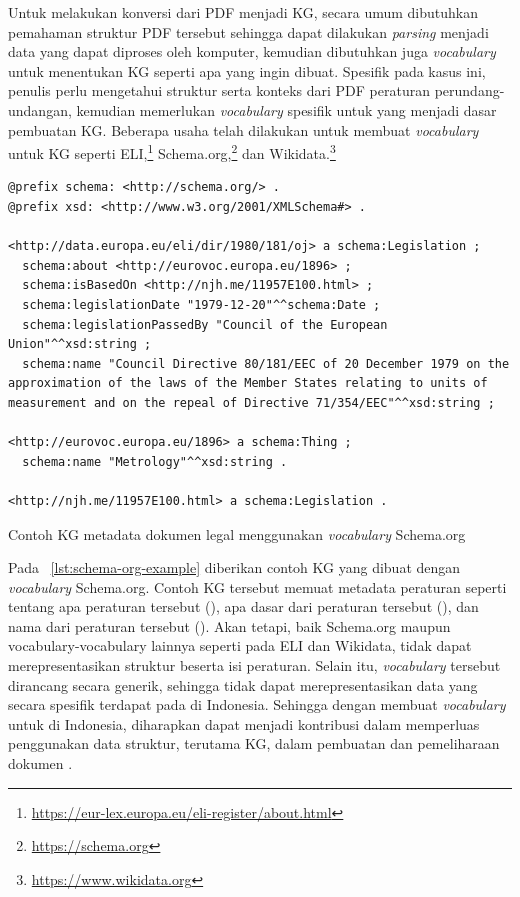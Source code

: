Untuk melakukan konversi dari PDF menjadi KG, secara umum dibutuhkan pemahaman struktur PDF tersebut
sehingga dapat dilakukan \textit{parsing} menjadi data yang dapat diproses oleh komputer, kemudian
dibutuhkan juga \textit{vocabulary} untuk menentukan KG seperti apa yang ingin dibuat. Spesifik pada
kasus \legal ini, penulis perlu mengetahui struktur serta konteks dari PDF peraturan
perundang-undangan, kemudian memerlukan \textit{vocabulary} spesifik untuk \legal yang menjadi dasar
pembuatan KG. Beberapa usaha telah dilakukan untuk membuat \textit{vocabulary} untuk KG \legal
seperti ELI,\footnote{\url{https://eur-lex.europa.eu/eli-register/about.html}}
Schema.org,\footnote{\url{https://schema.org}} dan
Wikidata.\footnote{\url{https://www.wikidata.org}}


\begin{listing}[H]
  \begin{verbatim}
@prefix schema: <http://schema.org/> .
@prefix xsd: <http://www.w3.org/2001/XMLSchema#> .

<http://data.europa.eu/eli/dir/1980/181/oj> a schema:Legislation ;
  schema:about <http://eurovoc.europa.eu/1896> ;
  schema:isBasedOn <http://njh.me/11957E100.html> ;
  schema:legislationDate "1979-12-20"^^schema:Date ;
  schema:legislationPassedBy "Council of the European Union"^^xsd:string ;
  schema:name "Council Directive 80/181/EEC of 20 December 1979 on the approximation of the laws of the Member States relating to units of measurement and on the repeal of Directive 71/354/EEC"^^xsd:string ;

<http://eurovoc.europa.eu/1896> a schema:Thing ;
  schema:name "Metrology"^^xsd:string .

<http://njh.me/11957E100.html> a schema:Legislation .
  \end{verbatim}
  \caption{Contoh KG metadata dokumen legal menggunakan \textit{vocabulary} Schema.org}
  \label{lst:schema-org-example}
\end{listing}

Pada \lst~\ref{lst:schema-org-example} diberikan contoh KG yang dibuat dengan \textit{vocabulary}
Schema.org. Contoh KG tersebut memuat metadata peraturan seperti tentang apa peraturan tersebut
(), apa dasar dari peraturan tersebut (), dan nama dari
peraturan tersebut (). Akan tetapi, baik Schema.org maupun vocabulary-vocabulary
lainnya seperti pada ELI dan Wikidata, tidak dapat merepresentasikan struktur beserta isi peraturan.
Selain itu, \textit{vocabulary} tersebut dirancang secara generik, sehingga tidak dapat
merepresentasikan data yang secara spesifik terdapat pada \legal di Indonesia. Sehingga dengan
membuat \textit{vocabulary} untuk \legal di Indonesia, diharapkan dapat menjadi kontribusi dalam
memperluas penggunakan data struktur, terutama KG, dalam pembuatan dan pemeliharaan dokumen \legal.

